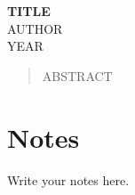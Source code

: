 \documentclass{article}
\begin{document}
\begin{center}
\Large{\textbf{TITLE}} \\ [0.2cm]
\small{\textsc{AUTHOR}} \\ [0.2cm]
\normalsize{\textsc{YEAR}} \\ [1cm]
\end{center}

\begin{abstract}
    ABSTRACT
\end{abstract}

\section{Notes}
	Write your notes here.
\end{document}
